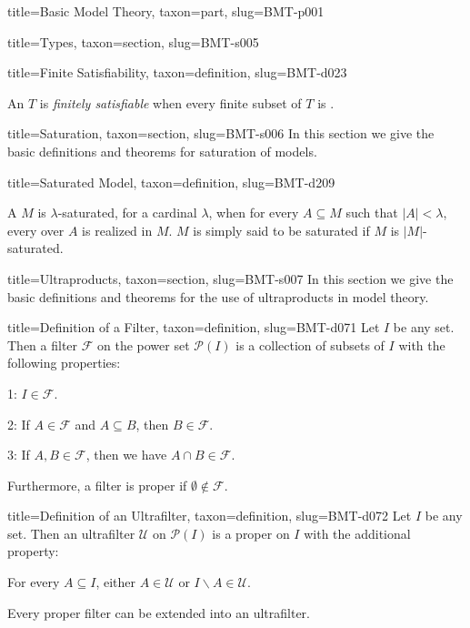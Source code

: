 \documentclass[a4paper]{article}
\begin{document}
\begin{tree}{title={Basic Model Theory}, taxon={part}, slug={BMT-p001}}
\begin{tree}{title={Types}, taxon={section}, slug={BMT-s005}}
\begin{tree}{title={Finite Satisfiability}, taxon={definition}, slug={BMT-d023}}

    An  \(T\) is \emph{finitely satisfiable} when every finite subset of \(T\) is .

\end{tree}

\end{tree}


  
  
\begin{tree}{title={Saturation}, taxon={section}, slug={BMT-s006}}
In this section we give the basic definitions and theorems for saturation of models.
\begin{tree}{title={Saturated Model}, taxon={definition}, slug={BMT-d209}}

    A  \(M\) is \(\lambda\)-saturated, for a cardinal \(\lambda\), when for every \(A \subseteq  M\) such that \(|A|< \lambda\), every  over \(A\) is realized in \(M\). \(M\) is simply said to be saturated if \(M\) is \(|M|\)-saturated.

\end{tree}

\end{tree}


  
  
\begin{tree}{title={Ultraproducts}, taxon={section}, slug={BMT-s007}}
In this section we give the basic definitions and theorems for the use of ultraproducts in model theory.
\begin{tree}{title={Definition of a Filter}, taxon={definition}, slug={BMT-d071}}
Let \(I\) be any set. Then a filter \(\mathcal {F}\) on the power set \(\mathcal {P}(I)\) is a collection of subsets of \(I\) with the following properties:\par{1: \(I \in \mathcal {F}\).}\par{2: If \(A \in   \mathcal {F}\) and \(A \subseteq  B\), then \(B \in   \mathcal {F}\).}\par{3: If \(A,B  \in   \mathcal {F}\), then we have \(A \cap  B \in   \mathcal {F}\).}\par{Furthermore, a filter is proper if \(\emptyset \notin \mathcal {F}\).}
\end{tree}

\begin{tree}{title={Definition of an Ultrafilter}, taxon={definition}, slug={BMT-d072}}
Let \(I\) be any set. Then an ultrafilter \(\mathcal {U}\) on \(\mathcal {P}(I)\) is a proper  on \(I\) with the additional property:\par{For every \(A \subseteq  I\), either \(A \in \mathcal {U}\) or \(I \backslash  A \in \mathcal {U}\).}\par{Every proper filter can be extended into an ultrafilter.}
\end{tree}


\end{tree}
\end{tree}
\end{document}
